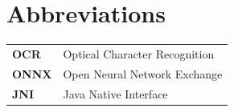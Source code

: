 \chapter*{Abbreviations}
%
%
\begin{tabular}{p{2cm} p{10cm}} 
  \textbf{OCR} & Optical Character Recognition \\ 
  \textbf{ONNX}& Open Neural Network Exchange \\ 
  \textbf{JNI} & Java Native Interface \\ 
\end{tabular}	





